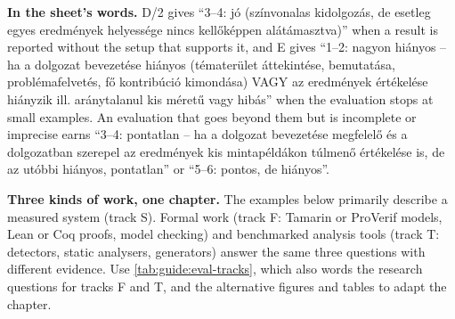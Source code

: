 \textbf{In the sheet's words.} D/2 gives \enquote{3--4: jó (színvonalas kidolgozás, de esetleg egyes eredmények helyessége nincs kellőképpen alátámasztva)} when a result is reported without the setup that supports it, and E gives \enquote{1--2: nagyon hiányos -- ha a dolgozat bevezetése hiányos (tématerület áttekintése, bemutatása, problémafelvetés, fő kontribúció kimondása) VAGY az eredmények értékelése hiányzik ill. aránytalanul kis méretű vagy hibás} when the evaluation stops at small examples. An evaluation that goes beyond them but is incomplete or imprecise earns \enquote{3--4: pontatlan -- ha a dolgozat bevezetése megfelelő és a dolgozatban szerepel az eredmények kis mintapéldákon túlmenő értékelése is, de az utóbbi hiányos, pontatlan} or \enquote{5--6: pontos, de hiányos}.

\textbf{Three kinds of work, one chapter.} The examples below primarily describe a measured system (track S). Formal work (track F: Tamarin or ProVerif models, Lean or Coq proofs, model checking) and benchmarked analysis tools (track T: detectors, static analysers, generators) answer the same three questions with different evidence. Use \cref{tab:guide:eval-tracks}, which also words the research questions for tracks F and T, and the alternative figures and tables to adapt the chapter.


